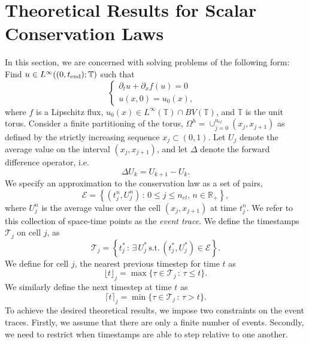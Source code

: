 \section{Theoretical Results for Scalar Conservation Laws}
\label{sec:method}
In this section, we are concerned with solving problems of the following form: Find $u \in L^{\infty}((0,t_{\text{end}}); \mathbb{T})$ such that
\begin{equation}
\begin{cases}
\partial_t u + \partial_x f(u) = 0&\\
u(x,0) = u_0(x),&
\end{cases}
\label{eq:ivp}
\end{equation}
where $f$ is a Lipschitz flux, $u_0(x) \in L^{\infty}(\mathbb{T})\cap BV(\mathbb{T})$, and $\mathbb{T}$ is the unit torus.  Consider a finite partitioning of the torus, $\Omega^h = \cup_{j=0}^{n_{el}} (x_j,x_{j+1})$ as defined by the strictly increasing sequence ${x_j} \subset (0,1)$. Let $U_j$ denote the average value on the interval $(x_j, x_{j+1})$, and let $\Delta$ denote the forward difference operator, i.e.
\begin{equation*}
\Delta U_k = U_{k+1} - U_k.
\end{equation*}
We specify an approximation to the conservation law as a set of pairs,
\begin{equation*}
\mathcal{E} = \left\{ (t_j^n, U_j^n)\,:\, 0 \le j \le n_{el},\,n\in\mathbb{R}_+ \right\},
\end{equation*}
where $U_j^n$ is the average value over the cell $(x_j,x_{j+1})$ at time $t_j^n$. We refer to this collection of space-time points as the {\em event trace}. We define the timestamps $\mathcal{T}_j$ on cell $j$, as
\begin{equation*}
\mathcal{T}_j = \left\{ t_j^* \, : \, \exists\, U_j^* \, \text{s.t.}\, (t_j^*,U_j^*) \in \mathcal{E} \right\}.
\end{equation*}
We define for cell $j$, the nearest previous timestep for time $t$ as
\begin{equation*}
\lfloor t \rfloor_j = \max \{ \tau \in \mathcal{T}_j \, : \, \tau \le t \}.
\end{equation*}
We similarly define the next timestep at time $t$ as
\begin{equation*}
\lceil t \rceil_j = \min \{ \tau \in \mathcal{T}_j\, : \, \tau > t \}.
\end{equation*}
To achieve the desired theoretical results, we impose two constraints on the event traces. Firstly, we assume that there are only a finite number of events. Secondly, we need to restrict when timestamps are able to step relative to one another. 

